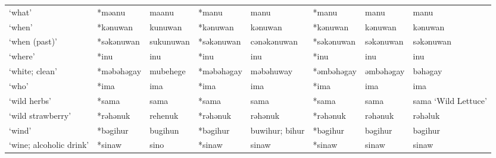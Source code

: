 \begin{landscape}
\begin{longtable}[c]{@{}p{3cm}<{\raggedright}p{2.75cm}<{\raggedright}p{2.75cm}<{\raggedright}p{2.75cm}<{\raggedright}p{2.75cm}<{\raggedright}p{2.75cm}<{\raggedright}p{2.75cm}<{\raggedright}p{2.75cm}<{\raggedright}@{}}
`what'                                               & *məanu             & maanu                          & *manu              & manu                       & *manu            & manu                     & manu                              \\
`when'                                               & *kənuwan           & kunuwan                        & *kənuwan           & kənuwan                    & *kənuwan         & kənuwan                  & kənuwan                           \\
`when (past)'                                        & *səkənuwan         & sukunuwan                      & *səkənuwan         & cənəkənuwan                & *səkənuwan       & səkənuwan                & səkənuwan                         \\
`where'                                              & *inu               & inu                            & *inu               & inu                        & *inu             & inu                      & inu                               \\
`white; clean'                                       & *məbəhəgay         & mubehege                       & *məbəhəgay         & məbəhuway                  & *əmbəhəgay       & əmbəhəgay                & bəhəgay                           \\
`who'                                                & *ima               & ima                            & *ima               & ima                        & *ima             & ima                      & ima                               \\
`wild herbs'                                         & *sama              & sama                           & *sama              & sama                       & *sama            & sama                     & sama `Wild Lettuce'               \\
`wild strawberry'                                    & *rəhənuk           & rehenuk                        & *rəhənuk           & rəhənuk                    & *rəhənuk         & rəhənuk                  & rəhəluk                           \\
`wind'                                               & *bəgihur           & bugihun                        & *bəgihur           & buwihur; bihur             & *bəgihur         & bəgihur                  & bəgihur                           \\
`wine; alcoholic drink'                              & *sinaw             & sino                           & *sinaw             & sinaw                      & *sinaw           & sinaw                    & sinaw                             \\

\end{longtable}
\end{landscape}

